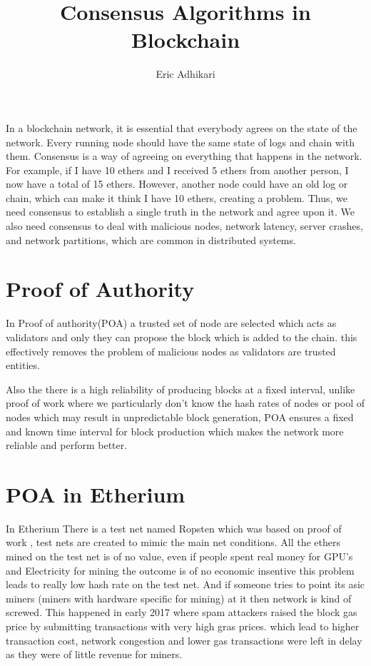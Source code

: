 \documentclass[a4paper,12pt]{article}
\newcommand{\cName}{Eric Adhikari}
\begin{document}
\title{Consensus Algorithms in Blockchain}
\author{\cName}
\date{} 

\maketitle

In a blockchain network, it is essential that everybody agrees on the state of the network. Every running node should have the same state of logs and chain with them. Consensus is a way of agreeing on everything that happens in the network. For example, if I have 10 ethers and I received 5 ethers from another person, I now have a total of 15 ethers. However, another node could have an old log or chain, which can make it think I have 10 ethers, creating a problem. Thus, we need consensus to establish a single truth in the network and agree upon it. We also need consensus to deal with malicious nodes, network latency, server crashes, and network partitions, which are common in distributed systems.

\section*{Proof of Authority}
In Proof of authority(POA) a trusted set of node are selected which acts as validators and only they can propose the block which is added to the chain.
this effectively removes the problem of malicious nodes as validators are trusted entities.

Also the there is a high reliability of producing blocks at a fixed interval, unlike proof of work where we particularly don't know the hash rates of nodes or pool of nodes which may result in unpredictable block generation, POA ensures a fixed and known time interval for block production which makes the network more reliable and perform better.



\section*{POA in Etherium}
In Etherium There is a test net named Ropsten which was based on proof of work , test nets are created to mimic the main net conditions. All the ethers mined on the test net is of no value, even if people spent real money for GPU's and Electricity for mining the outcome is of no economic insentive this problem leads to really low hash rate on the test net. And if someone tries to point its asic miners (miners with hardware specific for mining) at it then network is kind of screwed. This happened in early 2017 where spam attackers raised the block gas price by submitting transactions with very high gras prices. which lead to higher transaction cost, network congestion and lower gas transactions were left in delay as they were of little revenue for miners.
\end{document}

